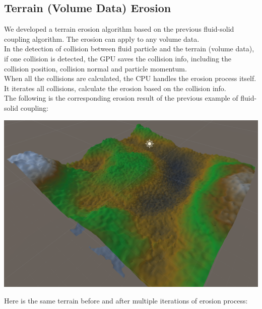 \documentclass[acmtog]{acmart}
\begin{document}
\subsection{Terrain (Volume Data) Erosion}
We developed a terrain erosion algorithm based on the previous fluid-solid coupling algorithm. The erosion can apply to any volume data.\\
In the detection of collision between fluid particle and the terrain (volume data), if one collision is detected, the GPU saves the collision info, including the collision position, collision normal and particle momentum.\\
When all the collisions are calculated, the CPU handles the erosion process itself. It iterates all collisions, calculate the erosion based on the collision info.\\
The following is the corresponding erosion result of the previous example of fluid-solid coupling:\\
\begin{center}
    \includegraphics[width=0.9\linewidth]{../Images/Coupling_Erosion}
\end{center}
Here is the same terrain before and after multiple iterations of erosion process:
\end{document}

